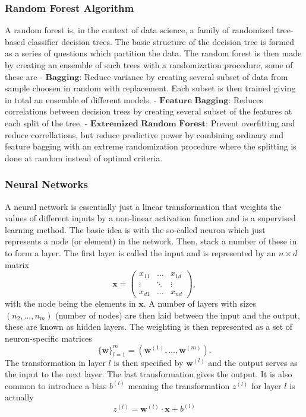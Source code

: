 \documentclass[11pt]{article}
\begin{document}
\hypertarget{random-forest-algorithm}{%
\subsubsection{Random Forest Algorithm}\label{random-forest-algorithm}}

A random forest is, in the context of data science, a family of
randomized tree-based classifier decision trees. The basic structure of
the decision tree is formed as a series of questions which partition the
data. The random forest is then made by creating an ensemble of such
trees with a randomization procedure, some of these are -
\(\textbf{Bagging}\): Reduce variance by creating several subset of data
from sample choosen in random with replacement. Each subset is then
trained giving in total an ensemble of different models. -
\(\textbf{Feature Bagging}\): Reduces correlations between decision
trees by creating several subset of the features at each split of the
tree. - \(\textbf{Extremized Random Forest}\): Prevent overfitting and
reduce correllations, but reduce predictive power by combining ordinary
and feature bagging with an extreme randomization procedure where the
splitting is done at random instead of optimal criteria.

\hypertarget{neural-networks}{%
\subsubsection{Neural Networks}\label{neural-networks}}

A neural network is essentially just a linear transformation that
weights the values of different inputs by a non-linear activation
function and is a supervised learning method. The basic idea is with the
so-called neuron which just represents a node (or element) in the
network. Then, stack a number of these in to form a layer. The first
layer is called the input and is represented by an \(n\times d\) matrix
\[\boldsymbol{x} = 
        \begin{pmatrix}
            x_{11} & \dots & x_{1d} \\
            \vdots & \ddots & \vdots \\
            x_{d1} & \dots & x_{nd}
        \end{pmatrix},\] with the node being the elements in
\(\boldsymbol{x}\). A number of layers with sizes \((n_2,\dots,n_m)\)
(number of nodes) are then laid between the input and the output, these
are known as hidden layers. The weighting is then represented as a set
of neuron-specific matrices
\[\{\boldsymbol{w}\}^m_{l=1} = \left(\boldsymbol{w}^{(1)},\dots,\boldsymbol{w}^{(m)}\right).\]
The transformation in layer \(l\) is then specified by
\(\boldsymbol{w}^{(l)}\) and the output serves as the input to the next
layer. The last transformation gives the output. It is also common to
introduce a bias \(b^{(l)}\) meaning the transformation \(z^{(l)}\) for
layer \(l\) is actually
\[z^{(l)} = \boldsymbol{w}^{(l)}\cdot \boldsymbol{x} + b^{(l)}\]
\end{document}
